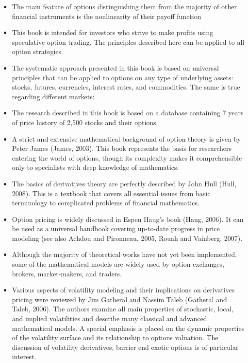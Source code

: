\begin{itemize}
            \item The main feature of options distinguishing them from the majority of other financial instruments is the nonlinearity of their payoff function
            \item This book is intended for investors who strive to make profits using speculative option trading. The principles described here can be applied to all option strategies.
            \item The systematic approach presented in this book is based on universal principles that can be applied to options on any type of underlying assets: stocks, futures, currencies, interest rates, and commodities. The same is true regarding different markets:
            \item The research described in this book is based on a database containing 7 years of price history of 2,500 stocks and their options.
            \item A strict and extensive mathematical background of option theory is given by Peter James (James, 2003). This book represents the basis for researchers entering the world of options, though its complexity makes it comprehensible only to specialists with deep knowledge of mathematics.
            \item The basics of derivatives theory are perfectly described by John Hull (Hull, 2008). This is a textbook that covers all essential issues from basic terminology to complicated problems of financial mathematics.
            \item Option pricing is widely discussed in Espen Haug’s book (Haug, 2006). It can be used as a universal handbook covering up-to-date progress in price modeling (see also Achdou and Pironneau, 2005, Rouah and Vainberg, 2007).
            \item Although the majority of theoretical works have not yet been implemented, some of the mathematical models are widely used by option exchanges, brokers, market-makers, and traders.
            \item Various aspects of volatility modeling and their implications on derivatives pricing were reviewed by Jim Gatheral and Nassim Taleb (Gatheral and Taleb, 2006). The authors examine all main properties of stochastic, local, and implied volatilities and describe many classical and advanced mathematical models. A special emphasis is placed on the dynamic properties of the volatility surface and its relationship to options valuation. The discussion of volatility derivatives, barrier end exotic options is of particular interest.

\end{itemize}
